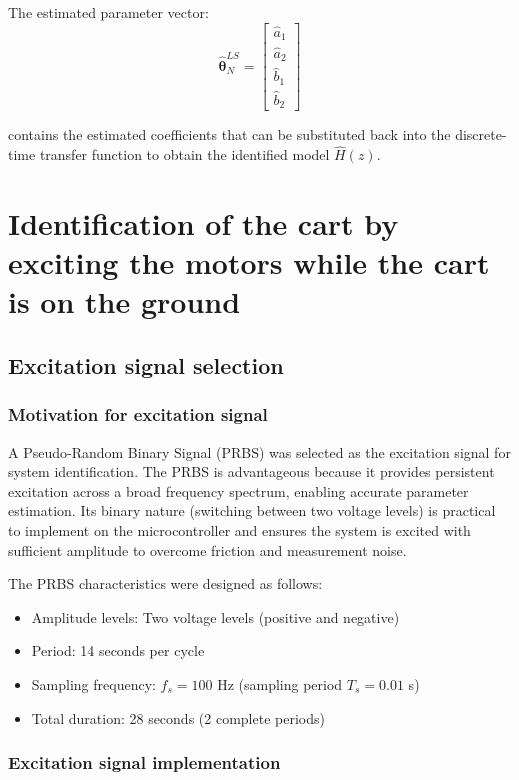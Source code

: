 \documentclass{article}
\begin{document}
	The estimated parameter vector:
	\begin{equation}
		\hat{\boldsymbol{\theta}}^{LS}_N = \begin{bmatrix}
			\hat{a}_1 \\ \hat{a}_2 \\ \hat{b}_1 \\ \hat{b}_2
		\end{bmatrix}
	\end{equation}
	
	contains the estimated coefficients that can be substituted back into the discrete-time transfer function to obtain the identified model $\hat{H}(z)$.
	
	
	\section{Identification of the cart by exciting the motors while the cart is on the ground}
	
	\subsection{Excitation signal selection}
	
	\subsubsection{Motivation for excitation signal}
	
	A Pseudo-Random Binary Signal (PRBS) was selected as the excitation signal for system identification. The PRBS is advantageous because it provides persistent excitation across a broad frequency spectrum, enabling accurate parameter estimation. Its binary nature (switching between two voltage levels) is practical to implement on the microcontroller and ensures the system is excited with sufficient amplitude to overcome friction and measurement noise.
	
	The PRBS characteristics were designed as follows:
	\begin{itemize}
		\item Amplitude levels: Two voltage levels (positive and negative)
		\item Period: 14 seconds per cycle
		\item Sampling frequency: $f_s = 100$ Hz (sampling period $T_s = 0.01$ s)
		\item Total duration: 28 seconds (2 complete periods)
	\end{itemize}
	
	\subsubsection{Excitation signal implementation}
	
\end{document}
